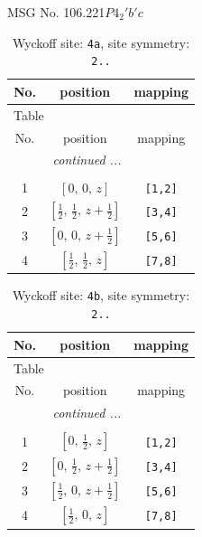 \documentclass[fleqn,8pt]{jsarticle}
\begin{document}
\setcounter{MaxMatrixCols}{32}

\renewcommand{\tablename}{Table~}
\renewcommand{\figurename}{Figure~}
\begin{center}
\LARGE
MSG No. 106.221\quad$P4_{2}'b'c$
\end{center}
\renewcommand{\arraystretch}{1.2}
\begin{longtable}{ccc}
\caption{Wyckoff site: {\tt 4a}, site symmetry: {\tt 2..}}
 \\
 \hline \hline
No. & position & mapping \\ \hline \endfirsthead

\multicolumn{2}{l}{\tablename\ \thetable{}} \\
 \hline \hline
No. & position & mapping \\ \hline \endhead

 \hline \hline
\multicolumn{2}{r}{\footnotesize\it continued ...} \\ \endfoot

 \hline \hline
\multicolumn{2}{r}{} \\ \endlastfoot

1 & $\left[ 0,\, 0,\, z \right]$ & {\tt [1,2]} \\ \hline
2 & $\left[ \frac{1}{2},\, \frac{1}{2},\, z + \frac{1}{2} \right]$ & {\tt [3,4]} \\ \hline
3 & $\left[ 0,\, 0,\, z + \frac{1}{2} \right]$ & {\tt [5,6]} \\ \hline
4 & $\left[ \frac{1}{2},\, \frac{1}{2},\, z \right]$ & {\tt [7,8]} \\
\end{longtable}
\renewcommand{\arraystretch}{1.2}
\begin{longtable}{ccc}
\caption{Wyckoff site: {\tt 4b}, site symmetry: {\tt 2..}}
 \\
 \hline \hline
No. & position & mapping \\ \hline \endfirsthead

\multicolumn{2}{l}{\tablename\ \thetable{}} \\
 \hline \hline
No. & position & mapping \\ \hline \endhead

 \hline \hline
\multicolumn{2}{r}{\footnotesize\it continued ...} \\ \endfoot

 \hline \hline
\multicolumn{2}{r}{} \\ \endlastfoot

1 & $\left[ 0,\, \frac{1}{2},\, z \right]$ & {\tt [1,2]} \\ \hline
2 & $\left[ 0,\, \frac{1}{2},\, z + \frac{1}{2} \right]$ & {\tt [3,4]} \\ \hline
3 & $\left[ \frac{1}{2},\, 0,\, z + \frac{1}{2} \right]$ & {\tt [5,6]} \\ \hline
4 & $\left[ \frac{1}{2},\, 0,\, z \right]$ & {\tt [7,8]} \\
\end{longtable}
\end{document}
